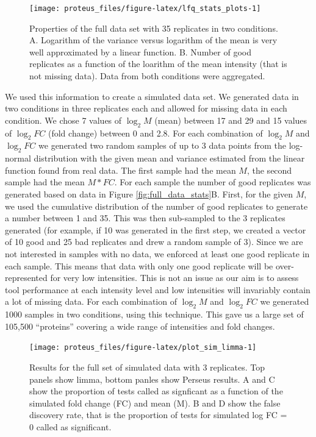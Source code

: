 \documentclass[]{article}
\begin{document}
\begin{figure}[H]

{\centering \texttt{[image: proteus\_files/figure-latex/lfq\_stats\_plots-1]} 

}

\caption{\label{fig:full_data_stats}Properties of the full data set with 35 replicates in two conditions. A. Logarithm of the variance versus logarithm of the mean is very well approximated by a linear function. B. Number of good replicates as a function of the loarithm of the mean intensity (that is not missing data). Data from both conditions were aggregated.}\label{fig:lfq_stats_plots}
\end{figure}

We used this information to create a simulated data set. We generated
data in two conditions in three replicates each and allowed for missing
data in each condition. We chose 7 values of \(\log_2 M\) (mean) between
17 and 29 and 15 values of \(\log_2 FC\) (fold change) between 0 and
2.8. For each combination of \(\log_2 M\) and \(\log_2 FC\) we generated
two random samples of up to 3 data points from the log-normal
distribution with the given mean and variance estimated from the linear
function found from real data. The first sample had the mean \(M\), the
second sample had the mean \(M * FC\). For each sample the number of
good replicates was generated based on data in Figure
\ref{fig:full_data_stats}B. First, for the given \(M\), we used the
cumulative distribution of the number of good replicates to generate a
number between 1 and 35. This was then sub-sampled to the 3 replicates
generated (for example, if 10 was generated in the first step, we
created a vector of 10 good and 25 bad replicates and drew a random
sample of 3). Since we are not interested in samples with no data, we
enforced at least one good replicate in each sample. This means that
data with only one good replicate will be over-represented for very low
intensities. This is not an issue as our aim is to assess tool
performance at each intensity level and low intensities will invariably
contain a lot of missing data. For each combination of \(\log_2 M\) and
\(\log_2 FC\) we generated 1000 samples in two conditions, using this
technique. This gave us a large set of 105,500 ``proteins'' covering a
wide range of intensities and fold changes.

\begin{figure}[H]

{\centering \texttt{[image: proteus\_files/figure-latex/plot\_sim\_limma-1]} 

}

\caption{\label{fig:simulation_rates}Results for the full set of simulated data with 3 replicates. Top panels show limma, bottom panles show Perseus results. A and C show the proportion of tests called as signficant as a function of the simulated fold change (FC) and mean (M). B and D show the false discovery rate, that is the proportion of tests for simulated log FC = 0 called as significant.}\label{fig:plot_sim_limma}
\end{figure}
\end{document}
